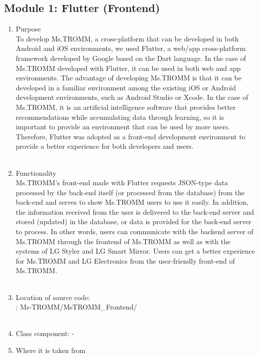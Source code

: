 \documentclass[conference]{IEEEtran}
\begin{document}
\subsection{Module 1: Flutter (Frontend)}
\begin{enumerate}
    \item Purpose\\
    To develop Ms.TROMM, a cross-platform that can be developed in both Android and iOS environments, we used Flutter, a web/app cross-platform framework developed by Google based on the Dart language. In the case of Ms.TROMM developed with Flutter, it can be used in both web and app environments. The advantage of developing Ms.TROMM is that it can be developed in a familiar environment among the existing iOS or Android development environments, such as Android Studio or Xcode. In the case of Ms.TROMM, it is an artificial intelligence software that provides better recommendations while accumulating data through learning, so it is important to provide an environment that can be used by more users. Therefore, Flutter was adopted as a front-end development environment to provide a better experience for both developers and users. \\ \\
    \item Functionality\\
    Ms.TROMM's front-end made with Flutter requests JSON-type data processed by the back-end itself (or processed from the database) from the back-end and serves to show Ms.TROMM users to use it easily. In addition, the information received from the user is delivered to the back-end server and stored (updated) in the database, or data is provided for the back-end server to process. In other words, users can communicate with the backend server of Ms.TROMM through the frontend of Ms.TROMM as well as with the systems of LG Styler and LG Smart Mirror. Users can get a better experience for Ms.TROMM and LG Electronics from the user-friendly front-end of Ms.TROMM. \\ \\
    \item Location of source code: \\: Ms-TROMM/MsTROMM\_Frontend/ \\ \\
    \item Class component: - \\
    \item Where it is taken from\\

\end{enumerate}
\end{document}

